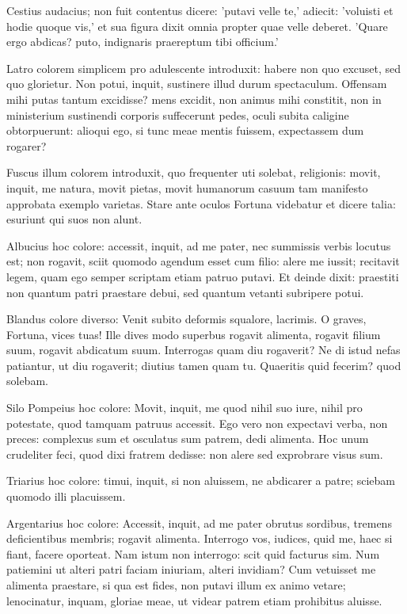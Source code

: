 Cestius audacius; non fuit contentus dicere: 'putavi velle te,' adiecit: 'voluisti et hodie quoque vis,' et sua figura dixit omnia propter quae velle deberet. 'Quare ergo abdicas? puto, indignaris praereptum tibi officium.'

\bigskip

Latro colorem simplicem pro adulescente introduxit: habere non quo excuset, sed quo glorietur. Non potui, inquit, sustinere illud durum spectaculum. Offensam mihi putas tantum excidisse? mens excidit, non animus mihi constitit, non in ministerium sustinendi corporis suffecerunt pedes, oculi subita caligine obtorpuerunt: alioqui ego, si tunc meae mentis fuissem, expectassem dum rogarer? 	

Fuscus illum colorem introduxit, quo frequenter uti solebat, religionis: movit, inquit, me natura, movit pietas, movit humanorum casuum tam manifesto approbata exemplo varietas. Stare ante oculos Fortuna videbatur et dicere talia: esuriunt qui suos non alunt. 	

Albucius hoc colore: accessit, inquit, ad me pater, nec summissis verbis locutus est; non rogavit, sciit quomodo agendum esset cum filio: alere me iussit; recitavit legem, quam ego semper scriptam etiam patruo putavi. Et deinde dixit: praestiti non quantum patri praestare debui, sed quantum vetanti subripere potui. 	

Blandus colore diverso: Venit subito deformis squalore, lacrimis. O graves, Fortuna, vices tuas! Ille dives modo superbus rogavit alimenta, rogavit filium suum, rogavit abdicatum suum. Interrogas quam diu rogaverit? Ne di istud nefas patiantur, ut diu rogaverit; diutius tamen quam tu. Quaeritis quid fecerim? quod solebam. 	

Silo Pompeius hoc colore: Movit, inquit, me quod nihil suo iure, nihil pro potestate, quod tamquam patruus accessit. Ego vero non expectavi verba, non preces: complexus sum et osculatus sum patrem, dedi alimenta. Hoc unum crudeliter feci, quod dixi fratrem dedisse: non alere sed exprobrare visus sum. 	

Triarius hoc colore: timui, inquit, si non aluissem, ne abdicarer a patre; sciebam quomodo illi placuissem.

Argentarius hoc colore: Accessit, inquit, ad me pater obrutus sordibus, tremens deficientibus membris; rogavit alimenta. Interrogo vos, iudices, quid me, haec si fiant, facere oporteat. Nam istum non interrogo: scit quid facturus sim. Num patiemini ut alteri patri faciam iniuriam, alteri invidiam? Cum vetuisset me alimenta praestare, si qua est fides, non putavi illum ex animo vetare; lenocinatur, inquam, gloriae meae, ut videar patrem etiam prohibitus aluisse.


